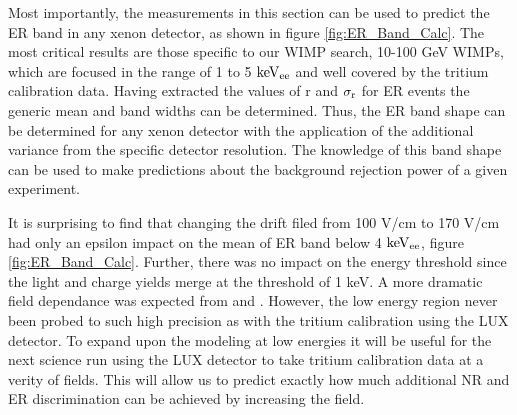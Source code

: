 Most importantly, the measurements in this section can be used to predict the ER band in any xenon detector, as shown in figure \ref{fig:ER_Band_Calc}. The most critical results are those specific to our WIMP search, 10-100 GeV WIMPs, which are focused in the range of 1 to 5 $\rm keV_{ee}$ and well covered by the tritium calibration data. Having extracted the values of r and $\rm \sigma_r$ for ER events the generic mean and band widths can be determined. Thus, the ER band shape can be determined for any xenon detector with the application of the additional variance from the specific detector resolution. The knowledge of this band shape can be used to make predictions about the background rejection power of a given experiment. 

It is surprising to find that changing the drift filed from 100 V/cm to 170 V/cm had only an epsilon impact on the mean of ER band below 4 $\rm keV_{ee}$, figure \ref{fig:ER_Band_Calc}. Further, there was no impact on the energy threshold since the light and charge yields merge at the threshold of 1 keV. A more dramatic field dependance was expected from \cite{Dahl_Thesis} and \cite{NEST_2013}. However, the low energy region never been probed to such high precision as with the tritium calibration using the LUX detector. To expand upon the modeling at low energies it will be useful for the next science run using the LUX detector to take tritium calibration data at a verity of fields. This will allow us to predict exactly how much additional NR and ER discrimination can be achieved by increasing the field. %
